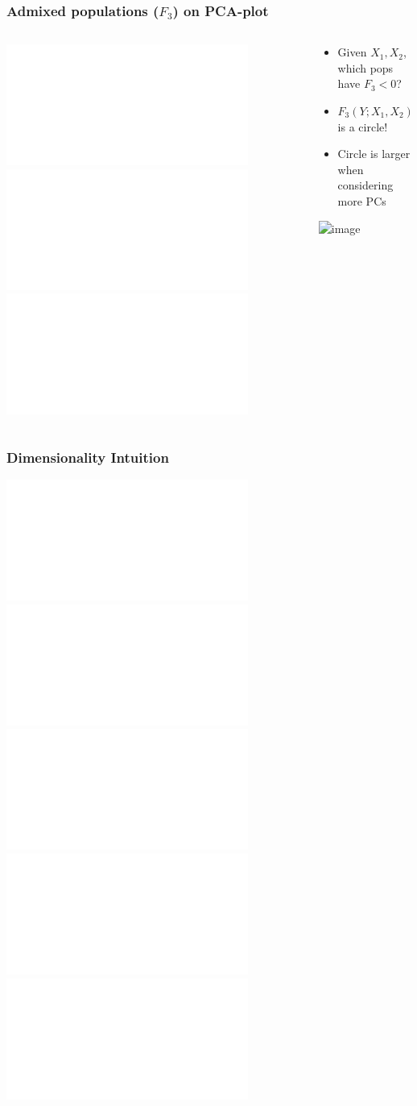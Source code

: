 \documentclass[11pt]{beamer}
\begin{document}
\begin{frame}
\frametitle{Admixed populations ($F_3$) on PCA-plot}
\begin{columns}
	\begin{column}{0.4\textwidth}
		\includegraphics<1>{figures/f3_on_pca_1b.pdf}
		\includegraphics<2-4>{figures/f3_on_pca_1.pdf}		
		\includegraphics<5>{figures/f3_on_pca_1d.pdf}				
	\end{column}
	\begin{column}{0.6\textwidth}
		\begin{itemize}
			\item<1-> Given $X_1, X_2$, which pops have $F_3 < 0$?	
			\item<2-> $F_3(Y; X_1, X_2) = 0$ is a circle!
			\item<5> Circle is larger when considering more PCs
		\end{itemize}
	
		\includegraphics<4>[width=\textwidth]{figures/mcvean2009_fig4b.png}
	\end{column}
\end{columns}
\end{frame}

\begin{frame}
\frametitle{Dimensionality Intuition}
\begin{center}
\includegraphics<1>[width=.5\textwidth]{figures/fig_proj_talk_0.pdf}
\includegraphics<2>[width=.5\textwidth]{figures/fig_proj_talk_1.pdf}
\includegraphics<3>[width=.5\textwidth]{figures/fig_proj_talk_2.pdf}
\includegraphics<4>[width=.5\textwidth]{figures/fig_proj_talk_3.pdf}
\includegraphics<5>[width=.5\textwidth]{figures/fig_proj_talk_4.pdf}
\end{center}	
\end{frame}
\end{document}
